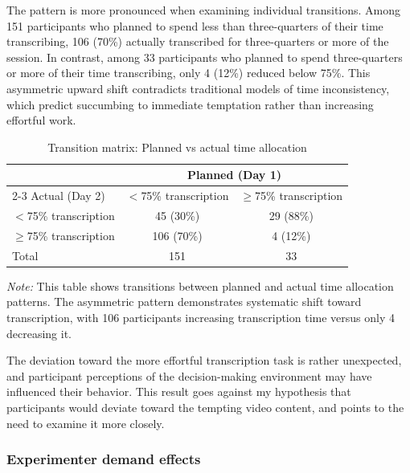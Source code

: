 \documentclass[11pt,a4paper,oneside]{article}
\begin{document}
The pattern is more pronounced when examining individual transitions. Among 151 participants who planned to spend less than three-quarters of their time transcribing, 106 (70\%) actually transcribed for three-quarters or more of the session. In contrast, among 33 participants who planned to spend three-quarters or more of their time transcribing, only 4 (12\%) reduced below 75\%. This asymmetric upward shift contradicts traditional models of time inconsistency, which predict succumbing to immediate temptation rather than increasing effortful work.

\begin{table}[H]
\centering
\begin{threeparttable}
\caption{Transition matrix: Planned vs actual time allocation}
\begin{tabular*}{\textwidth}{@{\extracolsep{\fill}}lcc}
\toprule
& \multicolumn{2}{c}{Planned (Day 1)} \\
\cmidrule(lr){2-3}
Actual (Day 2) & $<$75\% transcription & $\geq$75\% transcription \\
\midrule
$<$75\% transcription & 45 (30\%) & 29 (88\%) \\
$\geq$75\% transcription & 106 (70\%) & 4 (12\%) \\
\midrule
Total & 151 & 33 \\
\bottomrule
\end{tabular*}
\begin{tablenotes}[flushleft]
\footnotesize
\item[] \textit{Note:} This table shows transitions between planned and actual time allocation patterns. The asymmetric pattern demonstrates systematic shift toward transcription, with 106 participants increasing transcription time versus only 4 decreasing it.
\end{tablenotes}
\label{tab:transition_matrix}
\end{threeparttable}
\end{table}

The deviation toward the more effortful transcription task is rather unexpected, and participant perceptions of the decision-making environment may have influenced their behavior. This result goes against my hypothesis that participants would deviate toward the tempting video content, and points to the need to examine it more closely. 

\subsubsection{Experimenter demand effects}
\end{document}
